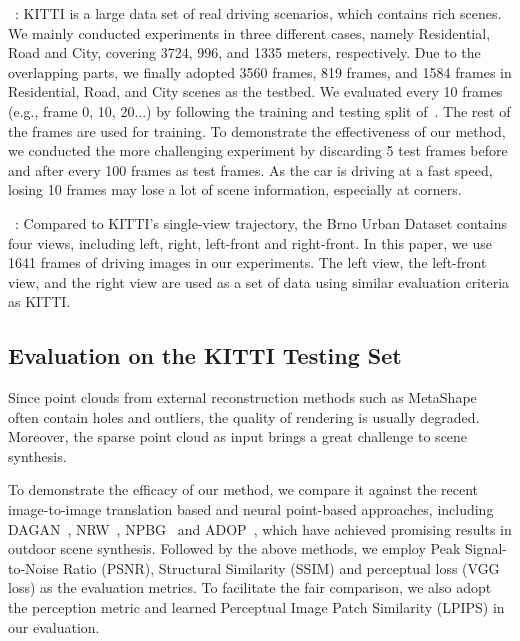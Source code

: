 \documentclass[sigconf]{acmart}
\begin{document}
~\cite{geiger2012we}: KITTI is a large data set of real driving scenarios, which contains rich scenes. We mainly conducted experiments in three different cases, namely Residential, Road and City, covering 3724, 996, and 1335 meters, respectively. Due to the overlapping parts, we finally adopted 3560 frames, 819 frames, and 1584 frames in Residential, Road, and City scenes as the testbed. We evaluated every 10 frames (e.g., frame 0, 10, 20...) by following the training and testing split of~\cite{aliev2020neural,ruckert2021adop}. The rest of the frames are used for training. To demonstrate the effectiveness of our method, we conducted the more challenging experiment by discarding 5 test frames before and after every 100 frames as test frames. As the car is driving at a fast speed, losing 10 frames may lose a lot of scene information, especially at corners.



~\cite{ligocki2020brno}: Compared to KITTI's single-view trajectory, the Brno Urban Dataset contains four views, including left, right, left-front and right-front. In this paper, we use 1641 frames of driving images in our experiments. The left view, the left-front view, and the right view are used as a set of data using similar evaluation criteria as KITTI.



\subsection{Evaluation on the KITTI Testing Set}

Since point clouds from external reconstruction methods such as MetaShape~\cite{Metashape} often contain holes and outliers, the quality of rendering is usually degraded. Moreover, the sparse point cloud as input brings a great challenge to scene synthesis.

To demonstrate the efficacy of our method, we compare it against the recent image-to-image translation based and neural point-based approaches, including DAGAN~\cite{tang2020dual}, NRW~\cite{meshry2019neural}, NPBG~\cite{aliev2020neural} and ADOP~\cite{ruckert2021adop}, which have achieved promising results in outdoor scene synthesis. Followed by the above methods, we employ Peak Signal-to-Noise Ratio (PSNR), Structural Similarity (SSIM) and perceptual loss (VGG loss) as the evaluation metrics. To facilitate the fair comparison, we also adopt the perception metric and learned Perceptual Image Patch Similarity (LPIPS) in our evaluation.
\end{document}
